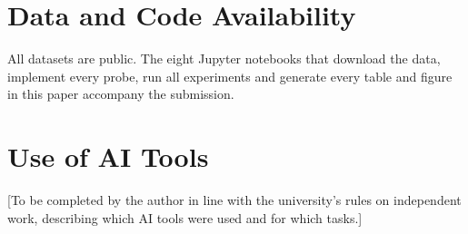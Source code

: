 \documentclass[conference]{IEEEtran}
\begin{document}


\FloatBarrier


\section*{Data and Code Availability}
All datasets are public. The eight Jupyter notebooks that download the data, implement every probe, run all experiments and generate every table and figure in this paper accompany the submission.

\section*{Use of AI Tools}
[To be completed by the author in line with the university's rules on independent work, describing which AI tools were used and for which tasks.]

\FloatBarrier

\end{document}
